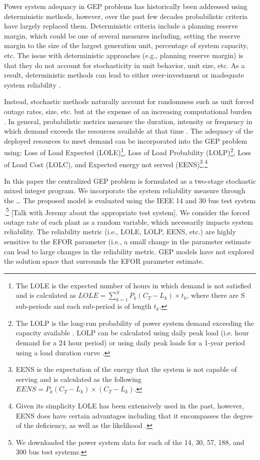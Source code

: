 \documentclass[10pt]{amsart}
\begin{document}
Power system adequacy in GEP problems has historically been addressed using deterministic methods, however, over the past few decades probabilistic criteria have largely replaced them.
Deterministic criteria include a planning reserve margin, which could be one of several measures including, setting the reserve margin to the size of the largest generation unit, percentage of system capacity, etc. 
The issue with deterministic approaches (e.g., planning reserve margin) is that they do not account for stochasticity in unit behavior, unit size, etc.
As a result, deterministic methods can lead to either over-investment or inadequate system reliability \parencite{aghaei:2013aa}.

Instead, stochastic methods naturally account for randomness such as unit forced outage rates, size, etc. but at the expense of an increasing computational burden \parencite{aghaei:2013aa}.  
In general, probabilistic metrics measure the duration, intensity or frequency in which demand exceeds the resources available at that time \parencite{dragoon:2006aa}.  	
The adequacy of the deployed resources to meet demand can be incorporated into the GEP problem using: Loss of Load Expected (LOLE)\footnote{The LOLE is the expected number of hours in which demand is not satisfied and is calculated as $LOLE = \sum_{k=1}^S P_k\left(C_T - L_k \right)\times t_k$, where there are S sub-periods and each sub-period is of length $t_k$.}, Loss of Load Probability (LOLP)\footnote{The LOLP is the long-run probability of power system demand exceeding the capacity available \parencite{endrenyi:1978}.  
LOLP can be calculated using daily peak load (i.e. hour demand for a 24 hour period) or using daily peak loads for a 1-year period using a load duration curve \parencite{endrenyi:1978}.}, Loss of Load Cost (LOLC), and Expected energy not served (EENS)\footnote{EENS is the expectation of the energy that the system is not capable of serving and is calculated as the following $EENS = P_k \left(C_T - L_k \right)\times \left(C_T- L_k \right)$.}.\footnote{Given its simplicity LOLE has been extensively used in the past, however, EENS does have certain advantages including that it encompasses the degree of the deficiency, as well as the likelihood \parencite[p622]{murugan2009nsga}.}

In this paper the centralized GEP problem is formulated as a two-stage stochastic mixed integer program.
We incorporate the system reliability measure through the \ldots
The proposed model is evaluated using the IEEE 14 and 30 bus test system \parencite{christie:2009aa}.\footnote{We downloaded the power system data for each of the 14, 30, 57, 188, and 300 bus test systems.}  
[Talk with Jeremy about the appropriate test system].
We consider the forced outage rate of each plant as a random variable, which necessarily impacts system reliability. 
The reliability metric (i.e., LOLE, LOLP, EENS, etc.) are highly sensitive to the EFOR parameter (i.e., a small change in the parameter estimate can lead to large changes in the reliability metric. 
GEP models have not explored the solution space that surrounds the EFOR parameter estimate. 
\end{document}
